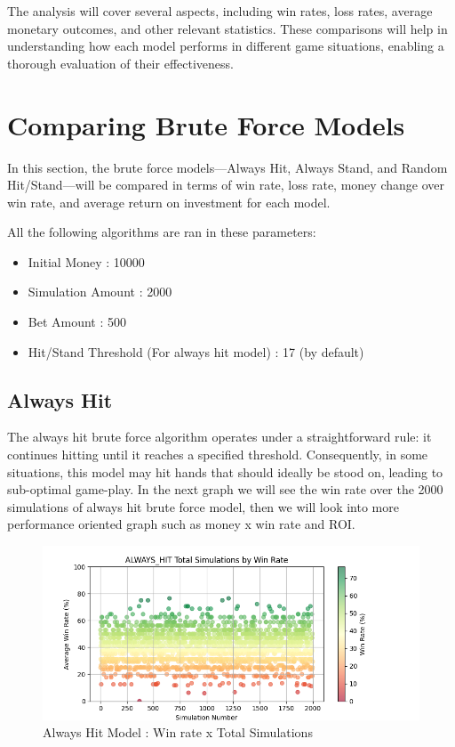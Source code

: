 \documentclass[a4paper,12pt]{report}
\begin{document}
The analysis will cover several aspects, including win rates, loss rates, average monetary outcomes, and other relevant statistics. These comparisons will help in understanding how each model performs in different game situations, enabling a thorough evaluation of their effectiveness.

\section{Comparing Brute Force Models}
In this section, the brute force models—Always Hit, Always Stand, and Random Hit/Stand—will be compared in terms of win rate, loss rate, money change over win rate, and average return on investment for each model.


All the following algorithms are ran in these parameters:
\begin{itemize}
    \item Initial Money : 10000
    \item Simulation Amount : 2000
    \item Bet Amount : 500
    \item Hit/Stand Threshold (For always hit model) : 17 (by default)
\end{itemize}

\subsection{Always Hit}

The always hit brute force algorithm operates under a straightforward rule: it continues hitting until it reaches a specified threshold. Consequently, in some situations, this model may hit hands that should ideally be stood on, leading to sub-optimal game-play. In the next graph we will see the win rate over the 2000 simulations of always hit brute force model, then we will look into more performance oriented graph such as money x win rate and ROI.

\begin{figure}[h]
\begin{center}
\includegraphics[scale=0.6]{figures/graphs/ah_wr_ts.png}
\end{center}
\caption{Always Hit Model : Win rate x Total Simulations}
\label{fig:ah_wr_ts}
\end{figure}
\end{document}
